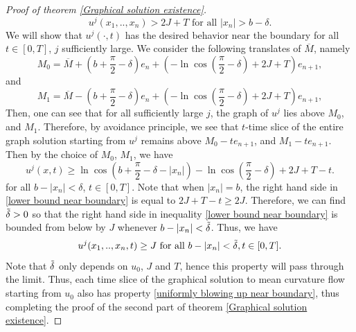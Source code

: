 \documentclass[pdflatex,sn-mathphys-num]{sn-jnl}%
\begin{document}
\begin{proof}[Proof of theorem \ref{Graphical solution existence}]
\begin{equation}
    u^j(x_1,..,x_n) > 2J + T \text{ for all }|x_n| > b - \delta.
\end{equation}
We will show that $u^j(\cdot, t)$ has the desired behavior near the boundary for all $t \in [0, T]$, $j$ sufficiently large. We consider the following translates of $\overline{M}$, namely
\begin{equation}
    M_0 = \overline{M} + (b + \frac{\pi}{2} - \delta)e_{n} + (-\ln\cos(\frac{\pi}{2} - \delta) + 2J + T)e_{n+1},
\end{equation}
and
\begin{equation}
    M_1 = \overline{M} - (b + \frac{\pi}{2} - \delta)e_{n} + (-\ln\cos(\frac{\pi}{2} - \delta) +  2J + T)e_{n+1},
\end{equation}
Then, one can see that for all sufficiently large $j$, the graph of $u^j$ lies above $M_0$, and $M_1$. Therefore, by avoidance principle, we see that $t$-time slice of the entire graph solution starting from $u^j$ remains above $M_0 - te_{n+1}$, and $M_1 - te_{n+1}$. Then by the choice of $M_0$, $M_1$, we have
\begin{equation}\label{lower bound near boundary}
    u^j(x,t) \geq \ln \cos (b+ \frac{\pi}{2} - \delta -|x_n|)-\ln\cos(\frac{\pi}{2} - \delta) + 2J + T - t.
\end{equation}
for all $ b - |x_n| < \delta$, $t \in [0, T]$. Note that when $|x_n| = b$, the right hand side in \eqref{lower bound near boundary} is equal to $2J + T - t \geq 2J$. Therefore, we can find $\Tilde{\delta} > 0$ so that the right hand side in inequality \eqref{lower bound near boundary} is bounded from below by $J$ whenever $b - |x_n| < \Tilde{\delta}$. Thus, we have
\begin{equation}
    u^j(x_1,..,x_n,t)\geq J \text{ for all }b - |x_n| < \Tilde{\delta}, t \in [0,T].
\end{equation}
Note that $\Tilde{\delta}$ only depends on $u_0$, $J$ and $T$, hence this property will pass through the limit. Thus, each time slice of the graphical solution to mean curvature flow starting from $u_0$ also has property \eqref{uniformly blowing up near boundary}, thus completing the proof of the second part of theorem \ref{Graphical solution existence}.
\end{proof}
\end{document}
